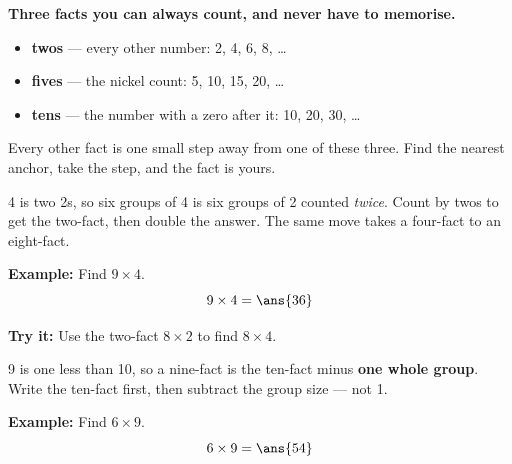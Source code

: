 \documentclass[12pt]{article}
\begin{document}

\begin{formulabox}
\textbf{Three facts you can always count, and never have to memorise.}
\begin{itemize}[leftmargin=0.9cm, itemsep=1pt, topsep=1pt]
\item \textbf{twos} --- every other number: 2, 4, 6, 8, \dots
\item \textbf{fives} --- the nickel count: 5, 10, 15, 20, \dots
\item \textbf{tens} --- the number with a zero after it: 10, 20, 30, \dots
\end{itemize}
Every other fact is one small step away from one of these three. Find the
nearest anchor, take the step, and the fact is yours.
\end{formulabox}


\begin{formulabox}
4 is two 2s, so six groups of 4 is six groups of 2 counted \emph{twice}. Count
by twos to get the two-fact, then double the answer. The same move takes a
four-fact to an eight-fact.
\end{formulabox}

\begin{examplebox}
\textbf{Example:} Find $9 \times 4$.
\[ 9 \times 4 = \ans{36} \]
\end{examplebox}

\begin{tryitbox}
\textbf{Try it:} Use the two-fact $8 \times 2$ to find $8 \times 4$.\\[2pt]
\end{tryitbox}


\begin{formulabox}
9 is one less than 10, so a nine-fact is the ten-fact minus \textbf{one whole
group}. Write the ten-fact first, then subtract the group size --- not 1.
\end{formulabox}

\begin{examplebox}
\textbf{Example:} Find $6 \times 9$.
\[ 6 \times 9 = \ans{54} \]
\end{examplebox}
\end{document}
